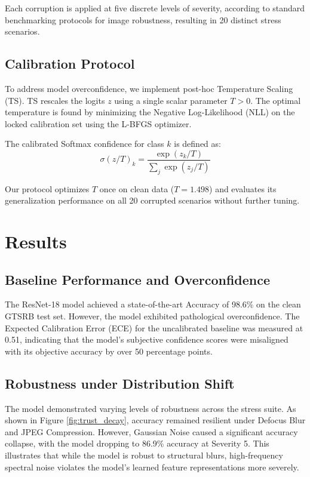 \documentclass[12pt,a4paper]{report}
\begin{document}
Each corruption is applied at five discrete levels of severity, according to standard benchmarking protocols for image robustness, resulting in 20 distinct stress scenarios.

\section{Calibration Protocol}
\label{sec:calibration_protocol}

To address model overconfidence, we implement post-hoc Temperature Scaling (TS). TS rescales the logits $z$ using a single scalar parameter $T > 0$. The optimal temperature is found by minimizing the Negative Log-Likelihood (NLL) on the locked calibration set using the L-BFGS optimizer.

The calibrated Softmax confidence for class $k$ is defined as:
\begin{equation}
    \sigma(z/T)_k = \frac{\exp(z_k / T)}{\sum_j \exp(z_j / T)}
\end{equation}

Our protocol optimizes $T$ once on clean data ($T=1.498$) and evaluates its generalization performance on all 20 corrupted scenarios without further tuning.

\chapter{Results}
\label{ch:results}

\section{Baseline Performance and Overconfidence}
\label{sec:baseline_results}

The ResNet-18 model achieved a state-of-the-art Accuracy of 98.6\% on the clean GTSRB test set. However, the model exhibited pathological overconfidence. The Expected Calibration Error (ECE) for the uncalibrated baseline was measured at 0.51, indicating that the model's subjective confidence scores were misaligned with its objective accuracy by over 50 percentage points.

\section{Robustness under Distribution Shift}
\label{sec:robustness_shift}

The model demonstrated varying levels of robustness across the stress suite. As shown in Figure \ref{fig:trust_decay}, accuracy remained resilient under Defocus Blur and JPEG Compression. However, Gaussian Noise caused a significant accuracy collapse, with the model dropping to 86.9\% accuracy at Severity 5. This illustrates that while the model is robust to structural blurs, high-frequency spectral noise violates the model's learned feature representations more severely.
\end{document}
